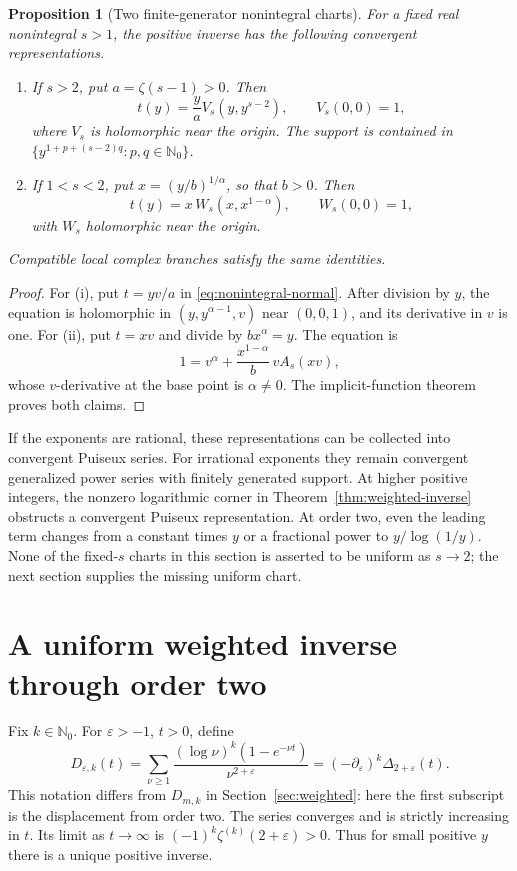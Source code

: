\documentclass[11pt,a4paper]{article}
\numberwithin{equation}{section}
\newtheorem{proposition}[theorem]{Proposition}
\theoremstyle{definition}
\theoremstyle{remark}
\newcommand{\Nzero}{\mathbb N_0}
\newcommand{\eps}{\varepsilon}
\begin{document}
\begin{proposition}[Two finite-generator nonintegral charts]
\label{prop:noninteger}
For a fixed real nonintegral \(s>1\), the positive inverse has the
following convergent representations.
\begin{enumerate}[label=(\roman*)]
\item If \(s>2\), put \(a=\zeta(s-1)>0\).  Then
\[
 t(y)=\frac ya V_s(y,y^{s-2}),\qquad V_s(0,0)=1,
\]
where \(V_s\) is holomorphic near the origin.
The support is contained in
\(\{y^{1+p+(s-2)q}:p,q\in\Nzero\}\).
\item If \(1<s<2\), put \(x=(y/b)^{1/\alpha}\), so that \(b>0\).
Then
\[
 t(y)=x\,W_s(x,x^{1-\alpha}),\qquad W_s(0,0)=1,
\]
with \(W_s\) holomorphic near the origin.
\end{enumerate}
Compatible local complex branches satisfy the same identities.
\end{proposition}

\begin{proof}
For (i), put \(t=yv/a\) in \eqref{eq:nonintegral-normal}.
After division by \(y\), the equation is holomorphic in
\((y,y^{\alpha-1},v)\) near \((0,0,1)\), and its derivative in \(v\)
is one.
For (ii), put \(t=xv\) and divide by \(b x^\alpha=y\).  The equation is
\[
 1=v^\alpha+\frac{x^{1-\alpha}}b\,vA_s(xv),
\]
whose \(v\)-derivative at the base point is \(\alpha\ne0\).
The implicit-function theorem proves both claims.
\end{proof}

If the exponents are rational, these representations can be collected
into convergent Puiseux series.  For irrational exponents they remain
convergent generalized power series with finitely generated support.
At higher positive integers, the nonzero logarithmic corner in
Theorem~\ref{thm:weighted-inverse} obstructs a convergent Puiseux
representation.  At order two, even the leading term changes from a
constant times \(y\) or a fractional power to \(y/\log(1/y)\).
None of the fixed-\(s\) charts in this section is asserted to be uniform
as \(s\to2\); the next section supplies the missing uniform chart.

\section{A uniform weighted inverse through order two}
\label{sec:critical}

Fix \(k\in\Nzero\).  For \(\eps>-1\), \(t>0\), define
\begin{equation}
 D_{\eps,k}(t)=
 \sum_{\nu\ge1}\frac{(\log\nu)^k(1-e^{-\nu t})}{\nu^{2+\eps}}
 =(-\partial_\eps)^k\Delta_{2+\eps}(t).
 \label{eq:Dcritical}
\end{equation}
This notation differs from \(D_{m,k}\) in Section~\ref{sec:weighted}:
here the first subscript is the displacement from order two.
The series converges and is strictly increasing in \(t\).
Its limit as \(t\to\infty\) is
\((-1)^k\zeta^{(k)}(2+\eps)>0\).
Thus for small positive \(y\) there is a unique positive inverse.
\end{document}
